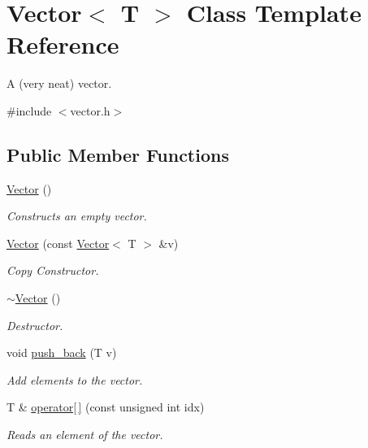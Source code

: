\hypertarget{classVector}{}\section{Vector$<$ T $>$ Class Template Reference}
\label{classVector}


A (very neat) vector.  




{\ttfamily \#include $<$vector.\+h$>$}

\subsection*{Public Member Functions}
\begin{DoxyCompactItemize}
\item 
\hyperlink{classVector_a39d6069675db4ecfc1ab81d440da759a}{Vector} ()
\begin{DoxyCompactList}\small\item\em Constructs an empty vector. \end{DoxyCompactList}\item 
\hyperlink{classVector_aa1671acb623cf2259dd60cf81db4f56a}{Vector} (const \hyperlink{classVector}{Vector}$<$ T $>$ \&v)
\begin{DoxyCompactList}\small\item\em Copy Constructor. \end{DoxyCompactList}\item 
\mbox{\label{classVector_afd524fac19e6d3d69db5198ffe2952b0}} 
\hyperlink{classVector_afd524fac19e6d3d69db5198ffe2952b0}{$\sim$\+Vector} ()
\begin{DoxyCompactList}\small\item\em Destructor. \end{DoxyCompactList}\item 
void \hyperlink{classVector_a31c38ed12e608a4e950391c7f3dfc114}{push\+\_\+back} (T v)
\begin{DoxyCompactList}\small\item\em Add elements to the vector. \end{DoxyCompactList}\item 
T \& \hyperlink{classVector_a6cf5a211415fd74a49d37c7ffe8f7d78}{operator\mbox{[}$\,$\mbox{]}} (const unsigned int idx)
\begin{DoxyCompactList}\small\item\em Reads an element of the vector. \end{DoxyCompactList}\item 

\end{DoxyCompactItemize}
